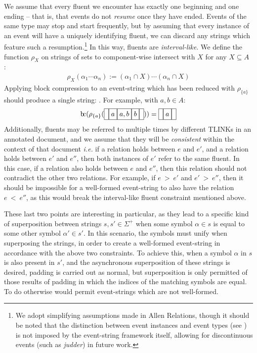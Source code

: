 \documentclass[a4paper,11pt,leqno]{article}
\makeatletter
\newcommand{\bc}{{\rm b\!c}}
\newcommand{\vph}[1]{\vphantom{#1}}
\newcommand{\ebox}[1]{\fbox{$\vph{',}#1$}}
\newcommand{\eboxb}[1]{\fbox{$\vph{@}#1$}}
\makeatother
\begin{document}
We assume that every fluent we encounter has exactly one beginning and one 
ending -- that is, that events do not \textit{resume} once they have ended. 
Events of the same type may stop and start frequently, but by assuming that 
every instance of an event will have a uniquely identifying fluent, we can 
discard any strings which feature such a resumption.\footnote{We adopt 
simplifying assumptions made in Allen Relations, though it should be noted that 
the distinction between event instances and event types (see 
\citealp{fernando2015semantics}) is not imposed by the 
event-string framework itself, allowing for discontinuous events (such as 
\textit{judder}) in future work.} In this way, fluents are 
\textit{interval-like}. We define the function 
$\rho_{X}$ on strings of sets to component-wise intersect with $X$ for 
any $X 
\subseteq A$ \citep{fernando2016regular}:
\begin{align}
\rho_{X}(\alpha_1 \cdots \alpha_n) := (\alpha_1 \cap X) \cdots 
(\alpha_n 
\cap 
X)
\end{align}
Applying block compression to an event-string which has been reduced with 
$\rho_{\{a\}}$ should produce a single string: \eboxb{}\eboxb{a}\eboxb{}. For 
example, with $a, b \in A$:
\begin{align}
\bc{}(\rho_{\{a\}}(\ebox{}\ebox{a}\ebox{a, b}\ebox{b}\ebox{})) = 
\ebox{}\ebox{a}\ebox{}
\end{align}
Additionally, fluents may be referred to multiple times by different TLINKs in 
an annotated document, and we assume that they will be \textit{consistent} 
within the context of that document \textit{i.e.} if a relation holds between 
$e$ and $e'$, and a relation holds between $e'$ and $e''$, then both instances 
of $e'$ refer to the same fluent. In this case, if a relation also holds 
between $e$ and $e''$, then this relation should not contradict the other two 
relations. For example, if $e~>~e'$ and $e'~>~e''$, then it should be 
impossible for a well-formed event-string to also have the relation $e~<~e''$, 
as this would break the interval-like fluent constraint mentioned above.

These last two points are interesting in particular, as they lead to a specific 
kind of superposition between strings $s, s' \in \Sigma^+$ when some 
symbol $\alpha \in s$ is equal to some other symbol $\alpha' \in s'$. In this 
scenario, the symbols must unify when superposing the strings, in order to 
create a well-formed event-string in accordance with the above two constraints. 
To achieve this, when a symbol $\alpha$ in $s$ is also present in $s'$, and the 
asynchronous superposition of these strings is desired, padding is carried out 
as normal, but superposition is only permitted of those results of padding 
in which the indices of the matching symbols are equal. To do otherwise would 
permit event-strings which are not well-formed.
\end{document}
